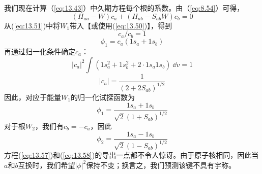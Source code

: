     我们现在计算（\ref{eq:13.43}）中久期方程每个根的系数。由（\ref{eq:8.54}）可得，
    \begin{equation}
        \left(H_{aa} - W\right)c_a + \left(H_{ab} - S_{ab}W\right)c_b = 0
        \label{eq:13.52}
    \end{equation}
    从(\ref{eq:13.51})中将$W_1$带入【或使用(\ref{eq:13.50})】，得到
    \begin{equation}
        c_a / c_b = 1
        \label{eq:13.53}
    \end{equation}
    \begin{equation}
        \phi_1 = c_a \left(1s_a + 1s_b\right)
        \label{eq:13.54}
    \end{equation}
    再通过归一化条件确定$c_a$：
    \begin{equation}
        \left|c_a\right|^2 \int \left(1s_a^2 + 1s_b^2 + 2 \cdot 1s_a1s_b\right) \:\dd v = 1
        \label{eq:13.55}
    \end{equation}
    \begin{equation}
        \left|c_a\right| = \frac{1}{\left(2 + 2S_{ab}\right)^{1/2}}
        \label{eq:13.56}
    \end{equation}
    因此，对应于能量$W_1$的归一化试探函数为
    \begin{equation}
        \phi_1 = \frac{1s_a + 1s_b}{\sqrt{2}\left(1 + S_{ab}\right)^{1/2}}
        \label{eq:13.57}
    \end{equation}
    对于根$W_2$，我们有$c_b = -c_a$，因此
    \begin{equation}
        \phi_2 = \frac{1s_a - 1s_b}{\sqrt{2}\left(1 - S_{ab}\right)^{1/2}}
        \label{eq:13.58}
    \end{equation}
    方程(\ref{eq:13.57})和(\ref{eq:13.58})的导出一点都不令人惊讶。由于原子核相同，因此当$a$和$b$互换时，我们希望$\left|\phi\right|^2$保持不变；换言之，我们预测该键不具有宇称。

